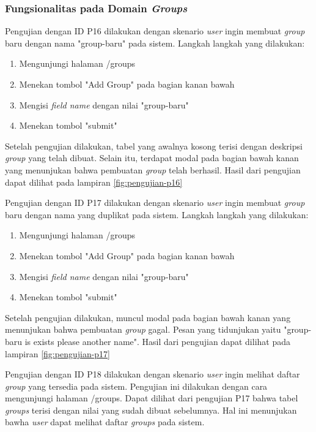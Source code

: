 \subsubsection{Fungsionalitas pada Domain \textit{Groups}}

Pengujian dengan ID P16 dilakukan dengan skenario \textit{user} ingin membuat \textit{group} baru dengan nama "group-baru" pada sistem. Langkah langkah yang dilakukan:
\begin{enumerate}
  \item Mengunjungi halaman /groups
  \item Menekan tombol "Add Group" pada bagian kanan bawah
  \item Mengisi \textit{field name} dengan nilai "group-baru"
  \item Menekan tombol "submit"
\end{enumerate}

Setelah pengujian dilakukan, tabel yang awalnya kosong terisi dengan deskripsi \textit{group} yang telah dibuat. Selain itu, terdapat modal pada bagian bawah kanan yang menunjukan bahwa pembuatan \textit{group} telah berhasil. Hasil dari pengujian dapat dilihat pada lampiran \ref{fig:pengujian-p16}

Pengujian dengan ID P17 dilakukan dengan skenario \textit{user} ingin membuat \textit{group} baru dengan nama yang duplikat pada sistem. Langkah langkah yang dilakukan:
\begin{enumerate}
  \item Mengunjungi halaman /groups
  \item Menekan tombol "Add Group" pada bagian kanan bawah
  \item Mengisi \textit{field name} dengan nilai "group-baru"
  \item Menekan tombol "submit"
\end{enumerate}

Setelah pengujian dilakukan, muncul modal pada bagian bawah kanan yang menunjukan bahwa pembuatan \textit{group} gagal. Pesan yang tidunjukan yaitu "group-baru is exists please another name". Hasil dari pengujian dapat dilihat pada lampiran \ref{fig:pengujian-p17}

Pengujian dengan ID P18 dilakukan dengan skenario \textit{user} ingin melihat daftar \textit{group} yang tersedia pada sistem. Pengujian ini dilakukan dengan cara mengunjungi halaman /groups. Dapat dilihat dari pengujian P17 bahwa tabel \textit{groups} terisi dengan nilai yang sudah dibuat sebelumnya. Hal ini menunjukan bawha \textit{user} dapat melihat daftar \textit{groups} pada sistem.

